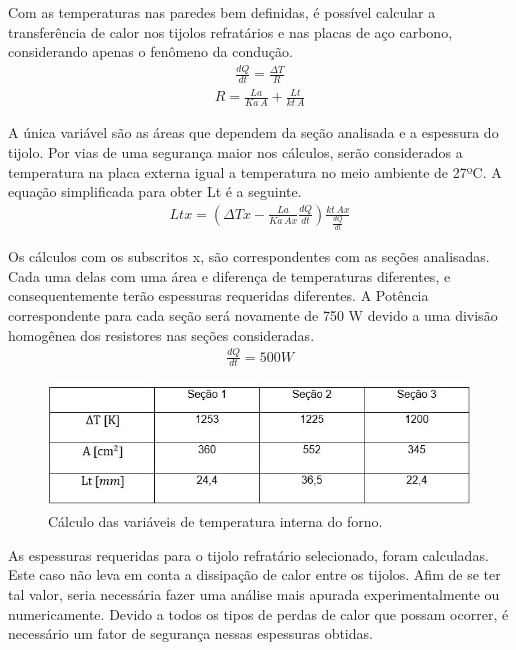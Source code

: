 Com as temperaturas nas paredes bem definidas, é possível calcular a transferência de calor nos tijolos refratários e nas placas de aço carbono, considerando apenas o fenômeno da condução.
\begin{gather}
	\frac{dQ}{dt} = \frac{\Delta T}{R}
\end{gather}
\begin{gather}
	R = \frac{La}{Ka\, A} + \frac{Lt}{kt\, A}
\end{gather}

 A única variável são as áreas que dependem da seção analisada e a espessura do tijolo. Por vias de uma segurança maior nos cálculos, serão considerados a temperatura na placa externa igual a temperatura no meio ambiente de 27ºC. A equação simplificada para obter Lt é a seguinte.
\begin{gather}
    Ltx = \left(\Delta Tx - \frac{La}{Ka\, Ax} \frac{dQ}{dt} \right) \frac{kt\, Ax}{\frac{dQ}{dt}}
\end{gather}

Os cálculos com os subscritos x, são correspondentes com as seções analisadas. Cada uma delas com uma área e diferença de temperaturas diferentes, e consequentemente terão espessuras requeridas diferentes. A Potência correspondente para cada seção será novamente de 750 W devido a uma divisão homogênea dos resistores nas seções consideradas.
\begin{gather}
	\frac{dQ}{dt} = 500W \nonumber
\end{gather}

\begin{figure}[ht]
	\centering
	\label{tab}
	\includegraphics[keepaspectratio=true,scale=1.0]{figuras/figura17.JPG}
	\caption{Cálculo das variáveis de temperatura interna do forno.}
\end{figure}

As espessuras requeridas para o tijolo refratário selecionado, foram calculadas. Este caso não leva em conta a dissipação de calor entre os tijolos. Afim de se ter tal valor, seria necessária fazer uma análise mais apurada experimentalmente ou numericamente.
Devido a todos os tipos de perdas de calor que possam ocorrer, é necessário um fator de segurança nessas espessuras obtidas.

